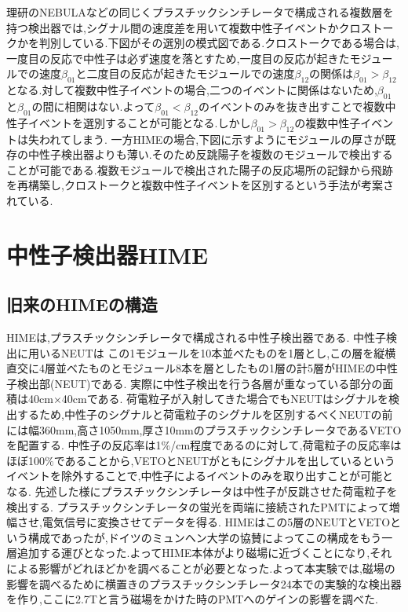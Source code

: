 \documentclass[dvipdfmx]{jsreport}
\begin{document}
理研のNEBULAなどの同じくプラスチックシンチレータで構成される複数層を持つ検出器では,シグナル間の速度差を用いて複数中性子イベントかクロストークかを判別している.下図がその選別の模式図である.クロストークである場合は,一度目の反応で中性子は必ず速度を落とすため,一度目の反応が起きたモジュールでの速度$\beta_{01}$と二度目の反応が起きたモジュールでの速度$\beta_{12}$の関係は$\beta_{01}>\beta_{12}$となる.対して複数中性子イベントの場合,二つのイベントに関係はないため,$\beta_{01}$と$\beta_{01}$の間に相関はない.よって$\beta_{01}<\beta_{12}$のイベントのみを抜き出すことで複数中性子イベントを選別することが可能となる.しかし$\beta_{01}>\beta_{12}$の複数中性子イベントは失われてしまう.
一方HIMEの場合,下図に示すようにモジュールの厚さが既存の中性子検出器よりも薄い.そのため反跳陽子を複数のモジュールで検出することが可能である.複数モジュールで検出された陽子の反応場所の記録から飛跡を再構築し,クロストークと複数中性子イベントを区別するという手法が考案されている.

\chapter{中性子検出器HIME}
\section{旧来のHIMEの構造}HIMEは,プラスチックシンチレータで構成される中性子検出器である.
中性子検出に用いるNEUTは
この1モジュールを10本並べたものを1層とし,この層を縦横直交に4層並べたものとモジュール8本を層としたもの1層の計5層がHIMEの中性子検出部(NEUT)である.
実際に中性子検出を行う各層が重なっている部分の面積は40cm$\times$40cmである.
荷電粒子が入射してきた場合でもNEUTはシグナルを検出するため,中性子のシグナルと荷電粒子のシグナルを区別するべくNEUTの前には幅360mm,高さ1050mm,厚さ10mmのプラスチックシンチレータであるVETOを配置する.
中性子の反応率は1$\%$/cm程度であるのに対して,荷電粒子の反応率はほぼ100$\%$であることから,VETOとNEUTがともにシグナルを出しているというイベントを除外することで,中性子によるイベントのみを取り出すことが可能となる.
先述した様にプラスチックシンチレータは中性子が反跳させた荷電粒子を検出する.
プラスチックシンチレータの蛍光を両端に接続されたPMTによって増幅させ,電気信号に変換させてデータを得る.
HIMEはこの5層のNEUTとVETOという構成であったが,ドイツのミュンヘン大学の協賛によってこの構成をもう一層追加する運びとなった.よってHIME本体がより磁場に近づくことになり,それによる影響がどれほどかを調べることが必要となった.よって本実験では,磁場の影響を調べるために横置きのプラスチックシンチレータ24本での実験的な検出器を作り,ここに2.7Tと言う磁場をかけた時のPMTへのゲインの影響を調べた.
\end{document}
